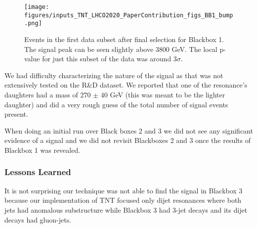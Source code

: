 \documentclass[a4paper,11pt]{article}
\begin{document}
\begin{figure}[h!]
\centering
\texttt{[image: figures/inputs\_TNT\_LHCO2020\_PaperContribution\_figs\_BB1\_bump.png]}
\caption{Events in the first data subset after final selection for Blackbox 1. The signal peak can be seen slightly above 3800 GeV. 
The local p-value for just this subset of the data was around 3$\sigma$. }
\label{fig:BB1_bump}
\end{figure}

We had difficulty characterizing the nature of the signal as that was not extensively tested on the R\&D dataset. 
We reported that one of the resonance's daughters had a mass of 270 $\pm$ 40 GeV (this was meant to be the lighter daughter) and did a very rough guess of the total number of signal events present. 

When doing an initial run over Black boxes 2 and 3 we did not see any significant evidence of a signal
and we did not revisit Blackboxes 2 and 3 once the results of Blackbox 1 was revealed.  

\subsubsection{Lessons Learned}
\label{sec:lessons}

\noindent
It is not surprising our technique was not able to find the signal in Blackbox 3 because our implementation of TNT focused only dijet resonances where both jets had anomalous substructure
while Blackbox 3 had 3-jet decays and its dijet decays had gluon-jets.
\end{document}
